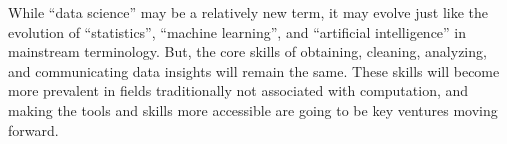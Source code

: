 \documentclass[010-intro.tex]{subfiles}
\begin{document}
    While ``data science'' may be a relatively new term,
    it may evolve just like the evolution of ``statistics'', ``machine learning'', and ``artificial intelligence''
    in mainstream terminology.
    But, the core skills of obtaining, cleaning, analyzing, and communicating data insights will remain the same.
    These skills will become more prevalent in fields traditionally not associated with computation,
    and making the tools and skills more accessible are going to be key ventures moving forward.
\end{document}
